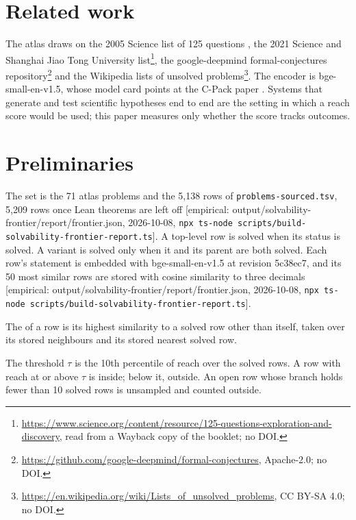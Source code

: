 \documentclass[11pt]{article}
\newcommand{\emp}[1]{\textcolor{bucketgray}{\footnotesize [empirical: #1]}}
\newcommand{\cmd}{\texttt{npx ts-node scripts/build-solvability-frontier-report.ts}}
\newcommand{\fr}{\emp{output/solvability-frontier/report/frontier.json, 2026-10-08, \cmd}}
\begin{document}
\section{Related work}
\label{sec:related}

The atlas draws on the 2005 Science list of 125 questions \autocite{kennedy2005whatdontweknow,science2005somuchmore}, the 2021 Science and Shanghai Jiao Tong University list\footnote{\url{https://www.science.org/content/resource/125-questions-exploration-and-discovery}, read from a Wayback copy of the booklet; no DOI.}, the google-deepmind formal-conjectures repository\footnote{\url{https://github.com/google-deepmind/formal-conjectures}, Apache-2.0; no DOI.} and the Wikipedia lists of unsolved problems\footnote{\url{https://en.wikipedia.org/wiki/Lists_of_unsolved_problems}, CC BY-SA 4.0; no DOI.}. The encoder is bge-small-en-v1.5, whose model card points at the C-Pack paper \autocite{xiao2023cpack}. Systems that generate and test scientific hypotheses end to end \autocite{gottweis2025coscientist,lu2024aiscientist} are the setting in which a reach score would be used; this paper measures only whether the score tracks outcomes.

\section{Preliminaries}
\label{sec:prelim}

\begin{definition}[Set]
\label{def:set}
The set is the 71 atlas problems and the 5,138 rows of \texttt{problems-sourced.tsv}, 5,209 rows once Lean theorems are left off \fr. A top-level row is solved when its status is solved. A variant is solved only when it and its parent are both solved. Each row's statement is embedded with bge-small-en-v1.5 at revision 5c38ec7, and its 50 most similar rows are stored with cosine similarity to three decimals \fr.
\end{definition}

\begin{definition}[Reach]
\label{def:reach}
The  of a row is its highest similarity to a solved row other than itself, taken over its stored neighbours and its stored nearest solved row.
\end{definition}

\begin{definition}[Frontier]
\label{def:frontier}
The  threshold $\tau$ is the 10th percentile of reach over the solved rows. A row with reach at or above $\tau$ is inside; below it, outside. An open row whose branch holds fewer than 10 solved rows is unsampled and counted outside.
\end{definition}
\end{document}
